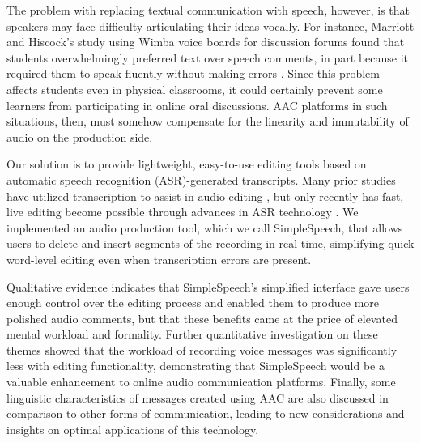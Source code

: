 The problem with replacing textual communication with speech, however, is that speakers may face difficulty articulating their ideas vocally.
For instance, Marriott and Hiscock's study using Wimba voice boards for discussion forums found that students overwhelmingly preferred text over speech comments, in part because it required them to speak fluently without making errors \cite{wimba}.
Since this problem affects students even in physical classrooms, it could certainly prevent some learners from participating in online oral discussions.
AAC platforms in such situations, then, must somehow compensate for the linearity and immutability of audio on the production side.

Our solution is to provide lightweight, easy-to-use editing tools based on automatic speech recognition (ASR)-generated transcripts.
Many prior studies have utilized transcription to assist in audio editing \cite{casares,rubin,whittaker_semantic}, but only recently has fast, live editing become possible through advances in ASR technology \cite{baker,saon}.
We implemented an audio production tool, which we call SimpleSpeech, that allows users to delete and insert segments of the recording in real-time, simplifying quick word-level editing even when transcription errors are present.

Qualitative evidence indicates that SimpleSpeech's simplified interface gave users enough control over the editing process and enabled them to produce more polished audio comments, but that these benefits came at the price of elevated mental workload and formality.
Further quantitative investigation on these themes showed that the workload of recording voice messages was significantly less with editing functionality, demonstrating that SimpleSpeech would be a valuable enhancement to online audio communication platforms.
Finally, some linguistic characteristics of messages created using AAC are also discussed in comparison to other forms of communication, leading to new considerations and insights on optimal applications of this technology.